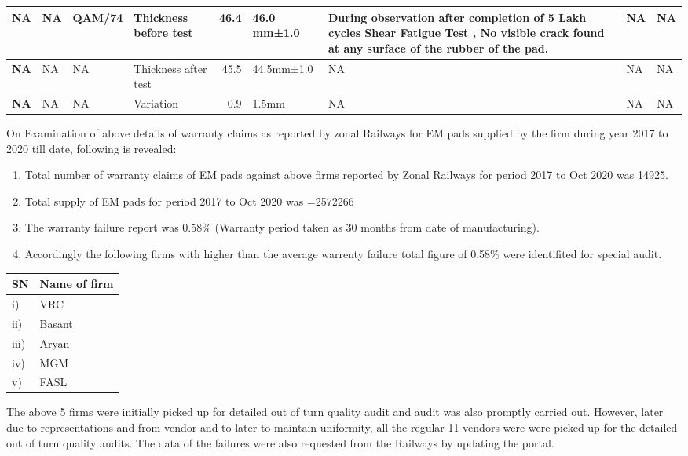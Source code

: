 \documentclass[nofonts,]{tufte-book}
\providecommand{\tightlist}{%
  \setlength{\itemsep}{0pt}\setlength{\parskip}{0pt}}
\begin{document}
\begin{table}
\begin{tabular}[t]{>{}r||>{\raggedright\arraybackslash}p{10em}|l|l|r|l|l|l|l}
\hline
\textbf{NA} & NA & QAM/74 & Thickness before test & 46.4 & 46.0 mm±1.0 & During observation after completion of 5 Lakh cycles Shear Fatigue Test , No visible crack found at any surface of the rubber of the pad. & NA & NA\\
\hline
\textbf{NA} & NA & NA & Thickness after test & 45.5 & 44.5mm±1.0 & NA & NA & NA\\
\hline
\textbf{NA} & NA & NA & Variation & 0.9 & 1.5mm & NA & NA & NA\\
\hline
\end{tabular}
\end{table}

On Examination of above details of warranty claims as reported by zonal
Railways for EM pads supplied by the firm during year 2017 to 2020 till
date, following is revealed:

\begin{enumerate}
\def\labelenumi{\alph{enumi}.}
\tightlist
\item
  Total number of warranty claims of EM pads against above firms
  reported by Zonal Railways for period 2017 to Oct 2020 was 14925.
\item
  Total supply of EM pads for period 2017 to Oct 2020 was =2572266
\item
  The warranty failure report was 0.58\% (Warranty period taken as 30
  months from date of manufacturing).
\item
  Accordingly the following firms with higher than the average warrenty
  failure total figure of 0.58\% were identifited for special audit.
\end{enumerate}

\begin{longtable}[]{@{}ll@{}}
\toprule
SN & Name of firm \\
\midrule
\endhead
i) & VRC \\
ii) & Basant \\
iii) & Aryan \\
iv) & MGM \\
v) & FASL \\
\bottomrule
\end{longtable}

The above 5 firms were initially picked up for detailed out of turn
quality audit and audit was also promptly carried out. However, later
due to representations and from vendor and to later to maintain
uniformity, all the regular 11 vendors were were picked up for the
detailed out of turn quality audits. The data of the failures were also
requested from the Railways by updating the portal.
\end{document}
